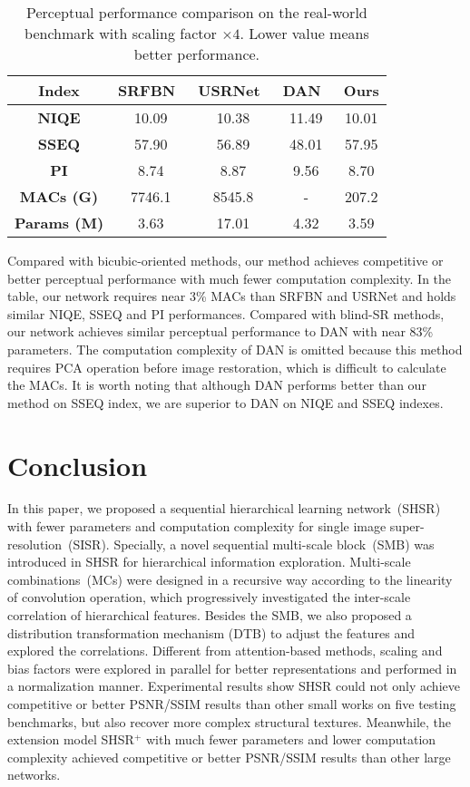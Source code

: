 \documentclass[manuscript,screen]{acmart}
\begin{document}
\begin{table*}[t]
	\centering
	\caption{Perceptual performance comparison on the real-world benchmark with scaling factor $\times4$. Lower value means better performance.}
	\label{tab:iqa}
	\fontsize{6.5}{8}\selectfont
	\begin{tabular}{|c||c|c||c||c|}
		\hline
		\textbf{Index}& \textbf{SRFBN~\cite{srfbn_cvpr2019}}& \textbf{USRNet~\cite{usrnet_cvpr2020}}& \textbf{DAN~\cite{dan_nips2020}} &\textbf{Ours}\\
		\hline
		\textbf{NIQE}& 10.09& 10.38& 11.49& 10.01 \\
		\textbf{SSEQ}& 57.90& 56.89& 48.01& 57.95 \\
		\textbf{PI}& 8.74& 8.87& 9.56& 8.70 \\
		\hline
		\textbf{MACs (G)}& 7746.1& 8545.8& -& 207.2 \\
		\textbf{Params (M)}& 3.63& 17.01& 4.32& 3.59 \\
		\hline
	\end{tabular}
\end{table*}

Compared with bicubic-oriented methods, our method achieves competitive or better perceptual performance with much fewer computation complexity. In the table, our network requires near 3\% MACs than SRFBN and USRNet and holds similar NIQE, SSEQ and PI performances. Compared with blind-SR methods, our network achieves similar perceptual performance to DAN with near 83\% parameters. The computation complexity of DAN is omitted because this method requires PCA operation before image restoration, which is difficult to calculate the MACs. It is worth noting that although DAN performs better than our method on SSEQ index, we are superior to DAN on NIQE and SSEQ indexes. 


\section{Conclusion}
In this paper, we proposed a sequential hierarchical learning network~(SHSR) with fewer parameters and computation complexity for single image super-resolution~(SISR). Specially, a novel sequential multi-scale block~(SMB) was introduced in SHSR for hierarchical information exploration. Multi-scale combinations~(MCs) were designed in a recursive way according to the linearity of convolution operation, which progressively investigated the inter-scale correlation of hierarchical features. Besides the SMB, we also proposed a distribution transformation mechanism (DTB) to adjust the features and explored the correlations. Different from attention-based methods, scaling and bias factors were explored in parallel for better representations and performed in a normalization manner. Experimental results show SHSR could not only achieve competitive or better PSNR/SSIM results than other small works on five testing benchmarks, but also recover more complex structural textures. Meanwhile, the extension model SHSR$^+$ with much fewer parameters and lower computation complexity achieved competitive or better PSNR/SSIM results than other large networks.
\end{document}
